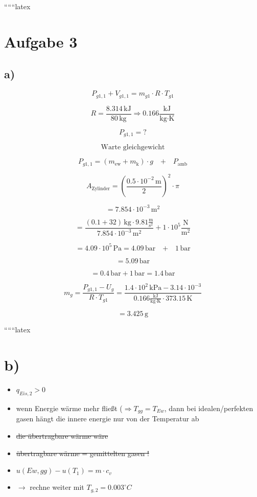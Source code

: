 
``````latex


\section*{Aufgabe 3}

\subsection*{a)}

\[
P_{g1,1} + V_{g1,1} = m_{g1} \cdot R \cdot T_{g1}
\]

\[
R = \frac{8.314 \, \text{kJ}}{80 \, \text{kg}} \Rightarrow 0.166 \frac{\text{kJ}}{\text{kg} \cdot \text{K}}
\]

\[
P_{g1,1} = ?
\]

\[
\text{Warte gleichgewicht}
\]

\[
P_{g1,1} = (m_{\text{ew}} + m_{\text{k}}) \cdot g \quad \text{+} \quad P_{\text{amb}}
\]

\[
A_{\text{Zylinder}} = (\frac{0.5 \cdot 10^{-2} \, \text{m}}{2})^2 \cdot \pi
\]

\[
= 7.854 \cdot 10^{-3} \, \text{m}^2
\]

\[
= \frac{(0.1 + 32) \, \text{kg} \cdot 9.81 \frac{\text{m}}{\text{s}^2}}{7.854 \cdot 10^{-3} \, \text{m}^2} + 1 \cdot 10^5 \frac{\text{N}}{\text{m}^2}
\]

\[
= 4.09 \cdot 10^5 \, \text{Pa} = 4.09 \, \text{bar} \quad \text{+} \quad 1 \, \text{bar}
\]

\[
= 5.09 \, \text{bar}
\]

\[
= 0.4 \, \text{bar} + 1 \, \text{bar} = 1.4 \, \text{bar}
\]

\[
m_{g} = \frac{P_{g1,1} - U_{g}}{R \cdot T_{g1}} = \frac{1.4 \cdot 10^2 \, \text{kPa} - 3.14 \cdot 10^{-3}}{0.166 \frac{\text{kJ}}{\text{kg} \cdot \text{K}} \cdot 373.15 \, \text{K}}
\]

\[
= 3.425 \, \text{g}
\]

``````latex


\section*{b)}
\begin{itemize}
    \item $q_{Eis,2} > 0$
    \item wenn Energie wärme mehr fließt ($\Rightarrow T_{gg} = T_{Ew}$, dann bei idealen/perfekten gasen hängt die innere energie nur von der Temperatur ab
    \item \sout{die übertragbare wärme wäre}
    \item \sout{übertragbare wärme = gemittelten gasen !}
    \item $u(Ew,gg) - u(T_1) = m \cdot c_v$
    \item $\rightarrow$ rechne weiter mit $T_{g,2} = 0.003^\circ C$
\end{itemize}

